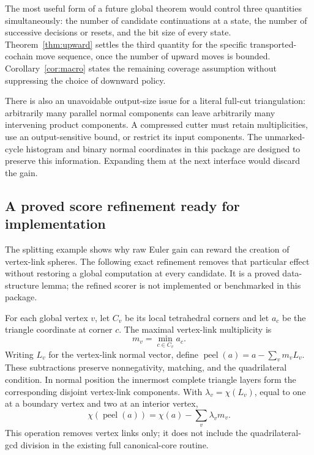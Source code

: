 \documentclass[11pt,letterpaper]{article}
\theoremstyle{definition}
\theoremstyle{remark}
\begin{document}
The most useful form of a future global theorem would control three
quantities simultaneously: the number of candidate continuations at a
state, the number of successive decisions or resets, and the bit size of
every state. Theorem~\ref{thm:upward} settles the third quantity for the
specific transported-cochain move sequence, once the number of upward
moves is bounded. Corollary~\ref{cor:macro} states the remaining coverage
assumption without suppressing the choice of downward policy.

There is also an unavoidable output-size issue for a literal full-cut
triangulation: arbitrarily many parallel normal components can leave
arbitrarily many intervening product components. A compressed cutter must
retain multiplicities, use an output-sensitive bound, or restrict its input
components. The unmarked-cycle histogram and binary normal coordinates in
this package are designed to preserve this information. Expanding them at
the next interface would discard the gain.

\subsection{A proved score refinement ready for implementation}
\label{sec:peeled}

The splitting example shows why raw Euler gain can reward the creation
of vertex-link spheres. The following exact refinement removes that
particular effect without restoring a global computation at every
candidate. It is a proved data-structure lemma; the refined scorer is
not implemented or benchmarked in this package.

For each global vertex $v$, let $C_v$ be its local tetrahedral corners
and let $a_c$ be the triangle coordinate at corner $c$. The maximal
vertex-link multiplicity is
\[
 m_v=\min_{c\in C_v}a_c.
\]
Writing $L_v$ for the vertex-link normal vector, define
$\operatorname{peel}(a)=a-\sum_v m_vL_v$. These subtractions preserve
nonnegativity, matching, and the quadrilateral condition. In normal
position the innermost complete triangle layers form the corresponding
disjoint vertex-link components. With
$\lambda_v=\chi(L_v)$, equal to one at a boundary vertex and two at an
interior vertex,
\[
 \chi(\operatorname{peel}(a))=\chi(a)-\sum_v\lambda_vm_v.
\]
This operation removes vertex links only; it does not include the
quadrilateral-gcd division in the existing full canonical-core routine.
\end{document}
